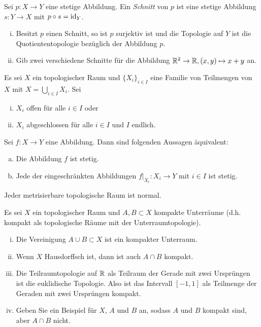 \begin{aufgabe}
	Sei $p\colon X\to Y$ eine stetige Abbildung. Ein \emph{Schnitt} von $p$ ist eine stetige Abbildung $s\colon Y\to X$ mit $p\circ s=\mathrm{id}_Y$.
	\begin{enumerate}[i)]
		\item Besitzt $p$ einen Schnitt, so ist $p$ surjektiv ist und die Topologie auf $Y$ ist die Quotiententopologie bezüglich der Abbildung $p$.
		\item Gib zwei verschiedene Schnitte für die Abbildung $\mathbb{R}^2\to \mathbb{R},(x,y)\mapsto x+y$ an.
	\end{enumerate}
\end{aufgabe}

\begin{aufgabe}\label{Aufgabe:Abbildungen_auf_Teilmengen}
	Es sei $X$ ein topologischer Raum und $\{X_i\}_{i\in I}$ eine Familie von Teilmengen von $X$ mit $X=\bigcup_{i\in I} X_i$.
	Sei
	\begin{enumerate}[i)]
		\item $X_i$ offen für alle $i\in I$ oder
		\item $X_i$ abgeschlossen für alle $i\in I$ und $I$ endlich.
	\end{enumerate}
	Sei $f\colon X\to Y$ eine Abbildung. Dann sind folgenden Aussagen äquivalent:
	\begin{enumerate}[a)]
		\item Die Abbildung $f$ ist stetig.
		\item Jede der eingeschränkten Abbildungen $f\vert_{X_i} \colon X_i \rightarrow Y$
		mit $i \in I$ ist stetig.
	\end{enumerate}
\end{aufgabe}

\begin{aufgabe}
	Jeder metrisierbare topologische Raum ist normal.
\end{aufgabe}

\begin{aufgabe}
	Es sei $X$ ein topologischer Raum und $A, B\subset X$ kompakte Unterräume (d.h. kompakt als topologische Räume mit der Unterraumtopologie).
	\begin{enumerate}[i)]
		\item Die Vereinigung $A\cup B\subset X$ ist ein kompakter Unterraum.
		\item Wenn $X$ Hausdorffsch ist, dann ist auch $A\cap B$ kompakt.
		\item Die Teilraumtopologie auf $\mathbb{R}$ als Teilraum der Gerade mit zwei Ursprüngen ist die euklidische Topologie. Also ist das Intervall $[-1,1]$ als Teilmenge der Geraden mit zwei Ursprüngen kompakt.
		\item Geben Sie ein Beispiel für $X$, $A$ und $B$ an, sodass $A$ und $B$ kompakt sind, aber $A\cap B$ nicht.
	\end{enumerate}
\end{aufgabe}
